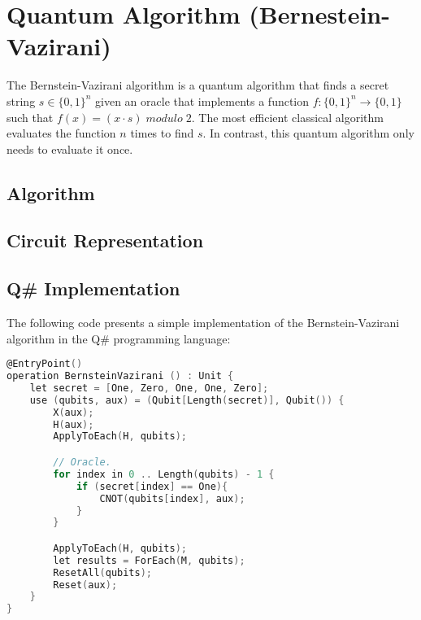 %
%
\chapter {Quantum Algorithm (Bernestein-Vazirani)}

The Bernstein-Vazirani algorithm\cite{BernsteinVazirani_1997} is a quantum algorithm that finds a secret string $s \in \{0, 1\}^n$ given an oracle that implements a function $f:\{0, 1\}^n \rightarrow \{0, 1\}$ such that $f(x) = (x \cdot s)\; modulo\; 2$. The most efficient classical algorithm evaluates the function $n$ times to find $s$. In contrast, this quantum algorithm only needs to evaluate it once.

\section{Algorithm}


\section{Circuit Representation}


\section{Q\# Implementation}

The following code presents a simple implementation of the Bernstein-Vazirani algorithm in the Q\# programming language:



\begin{lstlisting}[language=C]
@EntryPoint()
operation BernsteinVazirani () : Unit {
    let secret = [One, Zero, One, One, Zero];
    use (qubits, aux) = (Qubit[Length(secret)], Qubit()) {
        X(aux);
        H(aux);
        ApplyToEach(H, qubits);

        // Oracle.
        for index in 0 .. Length(qubits) - 1 {
            if (secret[index] == One){
                CNOT(qubits[index], aux);
            }
        }

        ApplyToEach(H, qubits);
        let results = ForEach(M, qubits);
        ResetAll(qubits);
        Reset(aux);
    }
}
\end{lstlisting}

